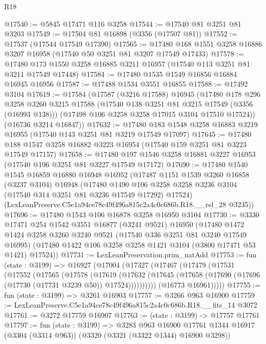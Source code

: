\begin{lexlean}{R18}
\begin{coremodule}
@17540 := @5845 @17471 @116 @3258
@17544 := @17540 @81 @3251 @81 @3203
@17549 := @17504 @81 @16898 (@3356 (@17507 @81))
@17552 := @17537 (@17544 @17549 @17390)
@17565 := @17480 @168 @1551 @3258 @16886 @3207 @16958 (@17540 @50 @3251 @81 @3207 @17549 @17433)
@17578 := @17480 @173 @1550 @3258 @16885 @3211 @16957 (@17540 @113 @3251 @81 @3211 @17549 @17448)
@17584 := @17480 @1535 @1549 @16856 @16884 @16945 @16956
@17587 := @17488 @1534 @3551 @16855
@17588 := @17492 @3104
@17619 := @17584
    (@17587
      (@3216 @17588)
      @16945
      (@17480
        @178
        @296
        @3258
        @3260
        @3215
        @17588
        (@17540 @138 @3251 @81 @3215 @17549 (@3356 (@16993 @138)))
        (@17498 @106 @3258 @3258 @17015 @3104 @17510 @17524))
      (@16736 @3214 @16847))
@17632 := @17480 @183 @1548 @3258 @16883 @3219 @16955 (@17540 @143 @3251 @81 @3219 @17549 @17097)
@17645 := @17480 @188 @1547 @3258 @16882 @3223 @16954 (@17540 @159 @3251 @81 @3223 @17549 @17157)
@17658 := @17480 @197 @1546 @3258 @16881 @3227 @16953 (@17540 @196 @3251 @81 @3227 @17549 @17172)
@17690 := @17480
    @1540
    @1545
    @16859
    @16880
    @16948
    @16952
    (@17487
      @1151
      @1539
      @3260
      @16858
      (@3237 @3104)
      @16948
      (@17480 @1490 @106 @3258 @3258 @3236 @3104 (@17540 @314 @3251 @81 @3236 @17549 @17292) @17524)
      (LexLeanPreserve.C5e1a94ce78c49f496a815c2a4c0c686b.R18.__rel_28 @3235))
@17696 := @17480 @1543 @106 @16878 @3258 @16950 @3104
@17730 := @3330
    @17471
    @254
    @1542
    @3551
    @16877
    (@3241 @9521)
    @16950
    (@17480
      @1472
      @1424
      @3258
      @3260
      @3240
      @9521
      (@17540 @336 @3251 @81 @3240 @17549 @16995)
      (@17480 @1422 @106 @3258 @3258 @1421 @3104 (@3800 @17471 @53 @1421) @17524))
@17731 := LexLeanPreservation.prim_natAdd
@17753 := fun (state : @3199) =>
  @16927
    (@17004
      (@17327
        (@17467
          (@17479
            (@17531
              (@17552
                (@17565
                  (@17578
                    (@17619
                      (@17632
                        (@17645 (@17658 (@17690 (@17696 (@17730 (@17731 @3239 @50)) @17524))))))))))
            (@16773 @16961)))))
@17755 := fun (state : @3199) => @3261 @16903
@17757 := @3266 @963 @16900
@17759 := LexLeanPreserve.C5e1a94ce78c49f496a815c2a4c0c686b.R18.__fits_14 @3072
@17761 := @3272 @17759 @16907
@17763 := (state : @3199) -> @17757 @17761
@17797 := fun (state : @3199) =>
  @3283
    @963
    @16900
    @17761
    @1344
    @16917
    (@3304 (@3314 @963))
    (@3320 (@3321 (@3322 @1344) @16900 @3298))

\end{coremodule}
\end{lexlean}
